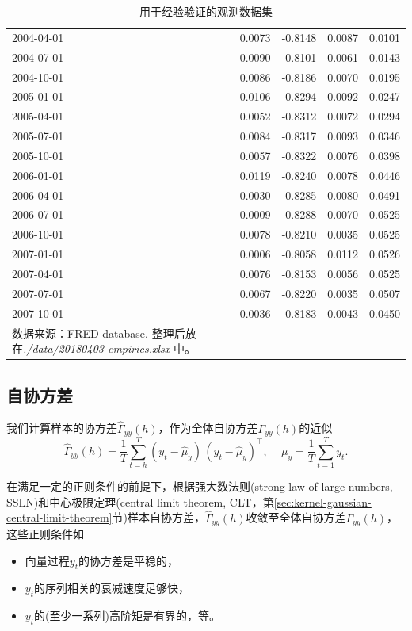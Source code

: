 \begin{longtable}{p{}|p{}p{}p{}p{}}
        2004-04-01	&0.0073	&-0.8148	&0.0087	&0.0101\\
        2004-07-01	&0.0090	&-0.8101	&0.0061	&0.0143\\
        2004-10-01	&0.0086	&-0.8186	&0.0070	&0.0195\\
        2005-01-01	&0.0106	&-0.8294	&0.0092	&0.0247\\
        2005-04-01	&0.0052	&-0.8312	&0.0072	&0.0294\\
        2005-07-01	&0.0084	&-0.8317	&0.0093	&0.0346\\
        2005-10-01	&0.0057	&-0.8322	&0.0076	&0.0398\\
        2006-01-01	&0.0119	&-0.8240	&0.0078	&0.0446\\
        2006-04-01	&0.0030	&-0.8285	&0.0080	&0.0491\\
        2006-07-01	&0.0009	&-0.8288	&0.0070	&0.0525\\
        2006-10-01	&0.0078	&-0.8210	&0.0035	&0.0525\\
        2007-01-01	&0.0006	&-0.8058	&0.0112	&0.0526\\
        2007-04-01	&0.0076	&-0.8153	&0.0056	&0.0525\\
        2007-07-01	&0.0067	&-0.8220	&0.0035	&0.0507\\
        2007-10-01	&0.0036	&-0.8183	&0.0043	&0.0450\\
        \hline
      \caption{用于经验验证的观测数据集}

      \small{数据来源：FRED database. 整理后放在\textit{./data/20180403-empirics.xlsx} 中。}
        \label{tab:stylized-ssrep-empirics-data}
\end{longtable}

\subsection{自协方差}
\label{sec:stylized-ssrep-empirics-var}

我们计算样本的协方差$\widehat{\Gamma}_{yy} \left(h \right)$，作为全体自协方差$\Gamma_{yy} \left(h \right)$的近似
\begin{equation}
  \label{eq:stylized-ssrep-empirics-autocovar}
  \widehat{\Gamma}_{yy} \left( h \right) = \frac{1}{T}
  \sum_{t=h}^{T} \left( y_{t} - \hat{\mu}_{y} \right) \,
  \left( y_{t} - \hat{\mu}_{y} \right)^{\top}, \quad \, \mu_{y} = \frac{1}{T} \sum_{t=1}^{T} y_{t}.
\end{equation}

在满足一定的正则条件的前提下，根据强大数法则(strong law of large numbers, SSLN)和中心极限定理(central limit theorem, CLT，第\ref{sec:kernel-gaussian-central-limit-theorem}节)样本自协方差，$\widehat{\Gamma}_{yy} \left(h \right)$收敛至全体自协方差$\Gamma_{yy} \left(h \right)$，这些正则条件如
\begin{itemize}
  \item 向量过程$y_{t}$的协方差是平稳的，
  \item $y_{t}$的序列相关的衰减速度足够快，
  \item $y_{t}$的(至少一系列)高阶矩是有界的，等。
\end{itemize}

